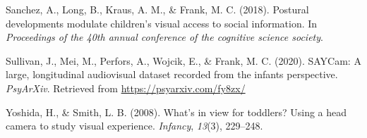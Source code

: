 \documentclass[10pt, letterpaper]{article}
\begin{document}
\leavevmode\hypertarget{ref-sanchez2018postural}{}%
Sanchez, A., Long, B., Kraus, A. M., \& Frank, M. C. (2018). Postural
developments modulate children's visual access to social information. In
\emph{Proceedings of the 40th annual conference of the cognitive science
society}.

\leavevmode\hypertarget{ref-SAYcam}{}%
Sullivan, J., Mei, M., Perfors, A., Wojcik, E., \& Frank, M. C. (2020).
SAYCam: A large, longitudinal audiovisual dataset recorded from the
infants perspective. \emph{PsyArXiv}. Retrieved from
\url{https://psyarxiv.com/fy8zx/}

\leavevmode\hypertarget{ref-yoshida2008}{}%
Yoshida, H., \& Smith, L. B. (2008). What's in view for toddlers? Using
a head camera to study visual experience. \emph{Infancy}, \emph{13}(3),
229--248.


\end{document}
